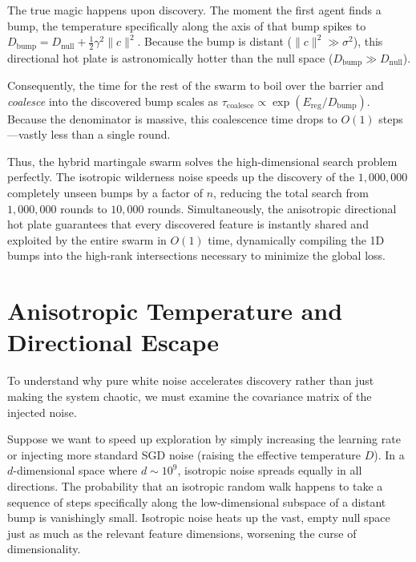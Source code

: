 \documentclass{article}
\begin{document}
The true magic happens upon discovery. The moment the first agent finds a bump, the temperature specifically along the axis of that bump spikes to $D_{\text{bump}} = D_{\text{null}} + \frac{1}{2}\gamma^2 \|c\|^2$. Because the bump is distant ($\|c\|^2 \gg \sigma^2$), this directional hot plate is astronomically hotter than the null space ($D_{\text{bump}} \gg D_{\text{null}}$). 

Consequently, the time for the rest of the swarm to boil over the barrier and \emph{coalesce} into the discovered bump scales as $\tau_{\text{coalesce}} \propto \exp(E_{\text{reg}} / D_{\text{bump}})$. Because the denominator is massive, this coalescence time drops to $O(1)$ steps---vastly less than a single round. 

Thus, the hybrid martingale swarm solves the high-dimensional search problem perfectly. The isotropic wilderness noise speeds up the discovery of the $1,000,000$ completely unseen bumps by a factor of $n$, reducing the total search from $1,000,000$ rounds to $10,000$ rounds. Simultaneously, the anisotropic directional hot plate guarantees that every discovered feature is instantly shared and exploited by the entire swarm in $O(1)$ time, dynamically compiling the 1D bumps into the high-rank intersections necessary to minimize the global loss.

\section{Anisotropic Temperature and Directional Escape}

To understand why pure white noise accelerates discovery rather than just making the system chaotic, we must examine the covariance matrix of the injected noise.

Suppose we want to speed up exploration by simply increasing the learning rate or injecting more standard SGD noise (raising the effective temperature $D$). In a $d$-dimensional space where $d \sim 10^9$, isotropic noise spreads equally in all directions. The probability that an isotropic random walk happens to take a sequence of steps specifically along the low-dimensional subspace of a distant bump is vanishingly small. Isotropic noise heats up the vast, empty null space just as much as the relevant feature dimensions, worsening the curse of dimensionality.
\end{document}
